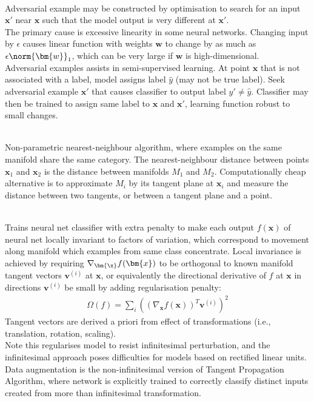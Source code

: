 \begin{remark} \\
Adversarial example may be constructed by optimisation to search for an input $\bm{x}'$ near $\bm{x}$ such that the model output is very different at $\bm{x}'$.\\
The primary cause is excessive linearity in some neural networks. Changing input by $\epsilon$ causes linear function with weights $\bm{w}$ to change by as much as $\epsilon \norm{\bm{w}}_1$, which can be very large if $\bm{w}$ is high-dimensional.\\
Adversarial examples assists in semi-supervised learning. At point $\bm{x}$ that is not associated with a label, model assigns label $\hat{y}$ (may not be true label). Seek adversarial example $\bm{x}'$ that causes classifier to output label $y' \neq \hat{y}$. Classifier may then be trained to assign same label to $\bm{x}$ and $\bm{x}'$, learning function robust to small changes.
\end{remark}

\begin{remark} \\
Non-parametric nearest-neighbour algorithm, where examples on the same manifold share the same category. The nearest-neighbour distance between points $\bm{x}_1$ and $\bm{x}_2$ is the distance between manifolds $M_1$ and $M_2$. Computationally cheap alternative is to approximate $M_i$ by its tangent plane at $\bm{x}_i$ and measure the distance between two tangents, or between a tangent plane and a point.
\end{remark}

\begin{remark} \\
Trains neural net classifier with extra penalty to make each output $f(\bm{x})$ of neural net locally invariant to factors of variation, which correspond to movement along manifold which examples from same class concentrate. Local invariance is achieved by requiring $\nabla_{\bm{\x}}f(\bm{x})$ to be orthogonal to known manifold tangent vectors $\bm{v}^{(i)}$ at $\bm{x}$, or equivalently the directional derivative of $f$ at $\bm{x}$ in directions $\bm{v}^{(i)}$ be small by adding regularisation penalty:
\begin{align}
\Omega(f) = \sum\limits_i \left( \left( \nabla_{\bm{x}} f(\bm{x}) \right)^T \bm{v}^{(i)} \right)^2 \nonumber
\end{align}
Tangent vectors are derived a priori from effect of transformations (i.e., translation, rotation, scaling).\\
Note this regularises model to resist infinitesimal perturbation, and the infinitesimal approach poses difficulties for models based on rectified linear units.\\
Data augmentation is the non-infinitesimal version of Tangent Propagation Algorithm, where network is explicitly trained to correctly classify distinct inputs created from more than infinitesimal transformation.
\end{remark}

